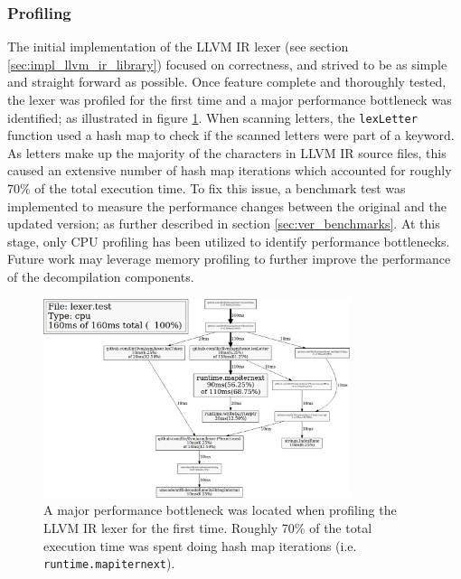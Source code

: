 
\subsubsection{Profiling}
\label{sec:ver_profiling}

The initial implementation of the LLVM IR lexer (see section \ref{sec:impl_llvm_ir_library}) focused on correctness, and strived to be as simple and straight forward as possible. Once feature complete and thoroughly tested, the lexer was profiled for the first time and a major performance bottleneck was identified; as illustrated in figure \ref{fig:lexer_pprof}. When scanning letters, the \texttt{lexLetter} function used a hash map to check if the scanned letters were part of a keyword. As letters make up the majority of the characters in LLVM IR source files, this caused an extensive number of hash map iterations which accounted for roughly 70\% of the total execution time. To fix this issue, a benchmark test was implemented to measure the performance changes between the original and the updated version; as further described in section \ref{sec:ver_benchmarks}. At this stage, only CPU profiling has been utilized to identify performance bottlenecks. Future work may leverage memory profiling to further improve the performance of the decompilation components.

\begin{figure}[htbp]
	\begin{center}
		\includegraphics[width=0.8\textwidth]{inc/8_ver/lexer_pprof.png}
		\caption{A major performance bottleneck was located when profiling the LLVM IR lexer for the first time. Roughly 70\% of the total execution time was spent doing hash map iterations (i.e. \texttt{runtime.mapiternext}).}
		\label{fig:lexer_pprof}
	\end{center}
\end{figure}
